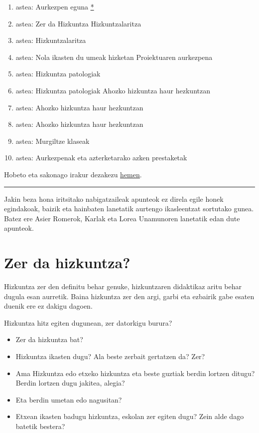 \documentclass[
]{book}
\providecommand{\tightlist}{%
  \setlength{\itemsep}{0pt}\setlength{\parskip}{0pt}}
\begin{document}
\begin{enumerate}
\def\labelenumi{\arabic{enumi}.}
\tightlist
\item
  astea: Aurkezpen eguna \href{https://juanabasolo.github.io/HD-HH/Baliabideak/00_aurkezpena/Ikasgaiaren_aurkezpena-diapo.html}{*}
\item
  astea: Zer da Hizkuntza \textbar{} Hizkuntzalaritza
\item
  astea: Hizkuntzalaritza
\item
  astea: Nola ikasten du umeak hizketan \textbar{} Proiektuaren aurkezpena
\item
  astea: Hizkuntza patologiak
\item
  astea: Hizkuntza patologiak \textbar{} Ahozko hizkuntza haur hezkuntzan
\item
  astea: Ahozko hizkuntza haur hezkuntzan
\item
  astea: Ahozko hizkuntza haur hezkuntzan
\item
  astea: Murgiltze klaseak
\item
  astea: Aurkezpenak eta azterketarako azken prestaketak
\end{enumerate}

Hobeto eta sakonago irakur dezakezu \href{https://juanabasolo.github.io/HD-HH/Baliabideak/00_aurkezpena/Syllabus_HDHH22-V0.pdf}{hemen}.

\begin{center}\rule{0.5\linewidth}{0.5pt}\end{center}

Jakin beza hona iritsitako nabigatzaileak apunteok ez direla egile honek egindakoak, baizik eta hainbaten lanetatik aurtengo ikasleentzat sortutako gunea.
Batez ere Asier Romerok, Karlak eta Lorea Unamunoren lanetatik edan dute apunteok.

\hypertarget{T1}{%
\chapter{Zer da hizkuntza?}\label{T1}}

Hizkuntza zer den definitu behar genuke, hizkuntzaren didaktikaz aritu behar dugula esan aurretik. Baina hizkuntza zer den argi, garbi eta ezbairik gabe esaten duenik ere ez dakigu dagoen.

Hizkuntza hitz egiten dugunean, zer datorkigu burura?

\begin{itemize}
\tightlist
\item
  Zer da hizkuntza bat?
\item
  Hizkuntza ikasten dugu? Ala beste zerbait gertatzen da? Zer?
\item
  Ama Hizkuntza edo etxeko hizkuntza eta beste guztiak berdin lortzen ditugu? Berdin lortzen dugu jakitea, alegia?
\item
  Eta berdin umetan edo nagusitan?
\item
  Etxean ikasten badugu hizkuntza, eskolan zer egiten dugu? Zein alde dago batetik bestera?
\end{itemize}
\end{document}

